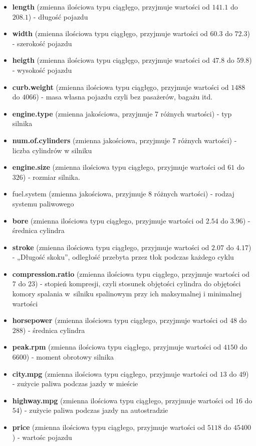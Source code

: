 \documentclass[12pt, a4paper]{article}\usepackage[]{graphicx}\usepackage[]{xcolor}
\begin{document}
\begin{itemize}
\item \textbf{length} (zmienna ilościowa typu ciągłęgo, przyjmuje wartości od $141.1$ do $208.1$) - długość pojazdu
\item \textbf{width} (zmienna ilościowa typu ciągłęgo, przyjmuje wartości od $60.3$ do $72.3$) - szerokość pojazdu
\item \textbf{heigth} (zmienna ilościowa typu ciągłęgo, przyjmuje wartości od $47.8$ do $59.8$) - wysokość pojazdu
\item \textbf{curb.weight} (zmienna ilościowa typu ciągłęgo, przyjmuje wartości od $1488$ do $4066$) - masa własna pojazdu czyli bez pasażerów, bagażu itd.
\item \textbf{engine.type} (zmienna jakościowa, przyjmuje 7 różnych wartości) - typ silnika
\item \textbf{num.of.cylinders} (zmienna jakościowa, przyjmuje 7 różnych wartości) - liczba cylindrów w silniku
\item \textbf{engine.size} (zmienna ilościowa typu ciągłego, przyjmuje wartości od $61$ do $326$) - rozmiar silnika.
\item {fuel.system} (zmienna jakościowa, przyjmuje 8 różnych wartości) - rodzaj systemu paliwowego
\item \textbf{bore} (zmienna ilościowa typu ciągłego, przyjmuje wartości od $2.54$ do $3.96$) - średnica cylindra
\item \textbf{stroke} (zmienna ilościowa typu ciągłego, przyjmuje wartości od $2.07$ do $4.17$) - „Długość skoku”, odległość przebyta przez tłok podczas każdego cyklu
\item \textbf{compression.ratio} (zmienna ilościowa typu ciągłego, przyjmuje wartości od $7$ do $23$) - stopień kompresji, czyli stosunek objętości cylindra do objętości komory spalania w~silniku spalinowym przy ich maksymalnej i minimalnej wartości
\item \textbf{horsepower} (zmienna ilościowa typu ciągłego, przyjmuje wartości od $48$ do $288$) - średnica cylindra
\item \textbf{peak.rpm} (zmienna ilościowa typu ciągłego, przyjmuje wartości od $4150$ do $6600$) - moment obrotowy silnika 
\item \textbf{city.mpg} (zmienna ilościowa typu ciągłego, przyjmuje wartości od $13$ do $49$) - zużycie paliwa podczas jazdy w mieście
\item \textbf{highway.mpg} (zmienna ilościowa typu ciągłego, przyjmuje wartości od $16$ do $54$) - zużycie paliwa podczas jazdy na autostradzie
\item \textbf{price} (zmienna ilościowa typu ciągłego, przyjmuje wartości od $5118$ do $45400$) - wartośc pojazdu



\end{itemize}
\end{document}
